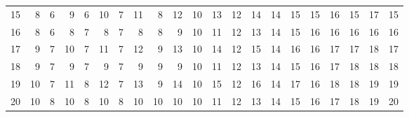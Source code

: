 \begin{tabular}{l|rrrrrrrrrrrrrrrrrrrr}
 15       &  8 & 6 &  9 & 6 & 10 & 7 & 11 &  8 & 12 & 10 & 13 & 12 & 14 & 14 & 15 & 15 & 16 & 15 & 17 & 15 \\
 16       &  8 & 6 &  8 & 7 &  8 & 7 &  8 &  8 &  9 & 10 & 11 & 12 & 13 & 14 & 15 & 16 & 16 & 16 & 16 & 16 \\
 17       &  9 & 7 & 10 & 7 & 11 & 7 & 12 &  9 & 13 & 10 & 14 & 12 & 15 & 14 & 16 & 16 & 17 & 17 & 18 & 17 \\
 18       &  9 & 7 &  9 & 7 &  9 & 7 &  9 &  9 &  9 & 10 & 11 & 12 & 13 & 14 & 15 & 16 & 17 & 18 & 18 & 18 \\
 19       & 10 & 7 & 11 & 8 & 12 & 7 & 13 &  9 & 14 & 10 & 15 & 12 & 16 & 14 & 17 & 16 & 18 & 18 & 19 & 19 \\
 20       & 10 & 8 & 10 & 8 & 10 & 8 & 10 & 10 & 10 & 10 & 11 & 12 & 13 & 14 & 15 & 16 & 17 & 18 & 19 & 20 \\
\hline
\end{tabular}

